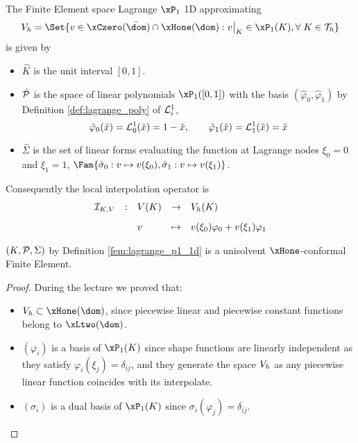 \medskip
\begin{dfntn}\label{fem:lagrange_p1_1d}
The Finite Element space Lagrange $\xPone$ 1D approximating
\begin{equation*}
\xVh = \Set{ v \in \xCzero(\bar\dom)\cap\xHone(\dom) : \Restrict{v}{K} \in\xP_1(K),\forany K \in\meshT }
\end{equation*}
is given by
\begin{itemize}
\item $\hat K$ is the unit interval $[0,1]$.
\item $\hat{{\mathcal P}}$ is the space of linear polynomials $\xPone([0,1])$ with the basis $(\hat\varphi_0, \hat\varphi_1)$ by Definition \ref{def:lagrange_poly} of $\mathcal L^{1}_{i}$,
\begin{equation*}
\hat\varphi_0(\hat x) = \mathcal L^{1}_{0}(\hat x) = 1 - \hat x, \qquad \hat\varphi_1(\hat x) = \mathcal L^{1}_{1}(\hat x) = \hat x
\end{equation*}
\item $\hat\Sigma$ is the set of linear forms evaluating the function at Lagrange nodes $\xi_0 = 0$ and $\xi_1 = 1$, $\Fam{\hat\sigma_0:v\mapsto v(\xi_0), \hat\sigma_1:v\mapsto v(\xi_1)}$.
\end{itemize}
\end{dfntn}

Consequently the local interpolation operator is
\begin{equation*}\label{fem:lagrange_local_interpolator}
\begin{array}{lclcl}
\mathop{\mathcal{I}_{K,{V}}} &:& {V}(K) &\rightarrow& {{V}}_h(K)\\[2ex]
           & & v   &\mapsto    & \displaystyle v(\xi_0) \varphi_0 + v(\xi_1) \varphi_1
\end{array}
\end{equation*}

\begin{prpstn}
${({K},{\mathcal P}, {\Sigma})}$ by Definition \ref{fem:lagrange_p1_1d} is a unisolvent $\xHone$-conformal Finite Element.
\end{prpstn}
\begin{proof}
During the lecture we proved that:
\begin{itemize}
\item $\xVh\subset\xHone(\dom)$, since piecewise linear and piecewise constant functions belong to $\xLtwo(\dom)$.
\item $(\varphi_i)$ is a basis of $\xPone(K)$ since shape functions are linearly independent as they satisfy $\varphi_i(\xi_j) = \delta_{ij}$, and they generate the space ${{V}}_h$ as any piecewise linear function coincides with its interpolate.
\item $(\sigma_i)$ is a dual basis of $\xPone(K)$ since $\sigma_i(\varphi_j) = \delta_{ij}$.
\end{itemize}
\end{proof}

